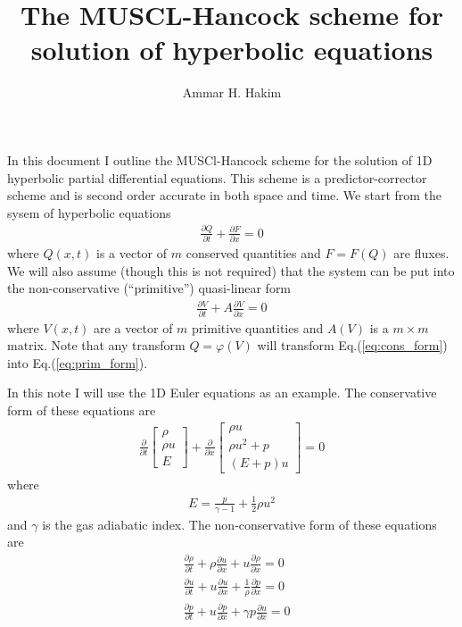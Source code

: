 \documentclass[11pt, reqno]{amsart}
\title{The MUSCL-Hancock scheme for solution of hyperbolic equations}%
\author{Ammar H. Hakim}%
\date{}
\newcommand{\eqr}[1]{Eq.\thinspace(#1)}
\newcommand{\pfrac}[2]{\frac{\partial #1}{\partial #2}}
\newcommand{\pfraca}[1]{\frac{\partial}{\partial #1}}
\theoremstyle{definition}
\begin{document}
\maketitle

In this document I outline the MUSCl-Hancock scheme for the solution
of 1D hyperbolic partial differential equations. This scheme is a
predictor-corrector scheme and is second order accurate in both space
and time. We start from the sysem of hyperbolic equations
\begin{align}
  \pfrac{Q}{t} + \pfrac{F}{x} = 0 \label{eq:cons_form}
\end{align}
where $Q(x,t)$ is a vector of $m$ conserved quantities and $F=F(Q)$
are fluxes. We will also assume (though this is not required) that the
system can be put into the non-conservative (``primitive'')
quasi-linear form
\begin{align}
  \pfrac{V}{t} + A\pfrac{V}{x} = 0 \label{eq:prim_form}
\end{align}
where $V(x,t)$ are a vector of $m$ primitive quantities and $A(V)$ is
a $m\times m$ matrix. Note that any transform $Q=\varphi(V)$ will
transform \eqr{\ref{eq:cons_form}} into \eqr{\ref{eq:prim_form}}. 

In this note I will use the 1D Euler equations as an example. The
conservative form of these equations are
\begin{align}
  \pfraca{t}
  \left[
    \begin{matrix}
      \rho \\
      \rho u \\
      E
    \end{matrix}
  \right]
  +
  \pfraca{x}
  \left[
    \begin{matrix}
      \rho u \\
      \rho u^2 + p \\
      (E+p)u
    \end{matrix}
  \right]
  =
  0
\end{align}
where
\begin{align}
  E = \frac{p}{\gamma-1} + \frac{1}{2}\rho u^2
\end{align}
and $\gamma$ is the gas adiabatic index. The non-conservative form of
these equations are
\begin{align}
  &\pfrac{\rho}{t} + \rho\pfrac{u}{x} + u \pfrac{\rho}{x} = 0 \\
  &\pfrac{u}{t} + u\pfrac{u}{x} + \frac{1}{\rho} \pfrac{p}{x} = 0 \\
  &\pfrac{p}{t} + u\pfrac{p}{x} + \gamma p \pfrac{u}{x} = 0 \\
\end{align}
\end{document}
